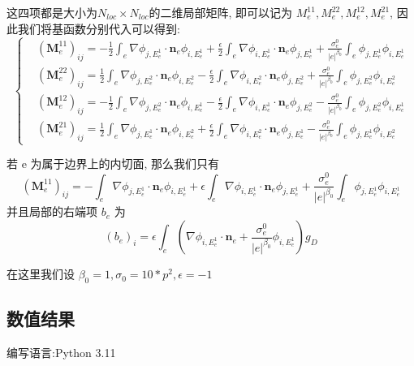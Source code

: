 这四项都是大小为$N_{loc}\times N_{loc}$的二维局部矩阵, 即可以记为 $M_e^{11},M_e^{22},M_e^{12},M_e^{21}$, 因此我们将基函数分别代入可以得到:
$$\left\{
    \begin{aligned}
        &\left(\boldsymbol{M}_{e}^{11}\right)_{i j}=-\frac{1}{2} \int_{e}  \nabla \phi_{j, E_{e}^{1}} \cdot \boldsymbol{n}_{e} \phi_{i, E_{e}^{1}}+\frac{\epsilon}{2} \int_{e}  \nabla \phi_{i, E_{e}^{1}} \cdot \boldsymbol{n}_{e} \phi_{j, E_{e}^{1}}+\frac{\sigma_{e}^{0}}{|e|^{\beta_{0}}} \int_{e} \phi_{j, E_{e}^{1}} \phi_{i, E_{e}^{1}}\\
        &\left(\boldsymbol{M}_{e}^{22}\right)_{i j}=\frac{1}{2} \int_{e}  \nabla \phi_{j, E_{e}^{2}} \cdot \boldsymbol{n}_{e} \phi_{i, E_{e}^{2}}-\frac{\epsilon}{2} \int_{e}  \nabla \phi_{i, E_{e}^{2}} \cdot \boldsymbol{n}_{e} \phi_{j, E_{e}^{2}}+\frac{\sigma_{e}^{0}}{|e|^{\beta_{0}}} \int_{e} \phi_{j, E_{e}^{2}} \phi_{i, E_{e}^{2}}\\
        &\left(\boldsymbol{M}_{e}^{12}\right)_{i j} =-\frac{1}{2} \int_{e}  \nabla \phi_{j, E_{e}^{2}} \cdot \boldsymbol{n}_{e} \phi_{i, E_{e}^{1}}-\frac{\epsilon}{2} \int_{e}  \nabla \phi_{i, E_{e}^{1}} \cdot \boldsymbol{n}_{e} \phi_{j, E_{e}^{2}}-\frac{\sigma_{e}^{0}}{|e|^{\beta_{0}}} \int_{e} \phi_{j, E_{e}^{2}} \phi_{i, E_{e}^{1}}\\
        &\left(\boldsymbol{M}_{e}^{21}\right)_{i j} =\frac{1}{2} \int_{e}  \nabla \phi_{j, E_{e}^{1}} \cdot \boldsymbol{n}_{e} \phi_{i, E_{e}^{2}}+\frac{\epsilon}{2} \int_{e}  \nabla \phi_{i, E_{e}^{2}} \cdot \boldsymbol{n}_{e} \phi_{j, E_{e}^{1}}-\frac{\sigma_{e}^{0}}{|e|^{\beta_{0}}} \int_{e} \phi_{j, E_{e}^{1}} \phi_{i, E_{e}^{2}} 
    \end{aligned}
\right.$$

若 e 为属于边界上的内切面, 那么我们只有
$$\left(\boldsymbol{M}_{e}^{11}\right)_{i j}=-\int_{e}  \nabla \phi_{j, E_{e}^{1}} \cdot \boldsymbol{n}_{e} \phi_{i, E_{e}^{1}}+\epsilon\int_{e}  \nabla \phi_{i, E_{e}^{1}} \cdot \boldsymbol{n}_{e} \phi_{j, E_{e}^{1}}+\frac{\sigma_{e}^{0}}{|e|^{\beta_{0}}} \int_{e} \phi_{j, E_{e}^{1}} \phi_{i, E_{e}^{1}}$$
并且局部的右端项 $b_e$ 为 
$$(b_e)_i=\epsilon\int_e\left(\nabla \phi_{i,E_{e}^1}\cdot \boldsymbol{n}_{e}+\frac{\sigma_{e}^{0}}{|e|^{\beta_{0}}}\phi_{i, E_{e}^{1}}\right)g_D$$

在这里我们设 $\beta_0=1, \sigma_0 = 10*p^2, \epsilon=-1$

\subsection{数值结果}
编写语言:Python 3.11 
